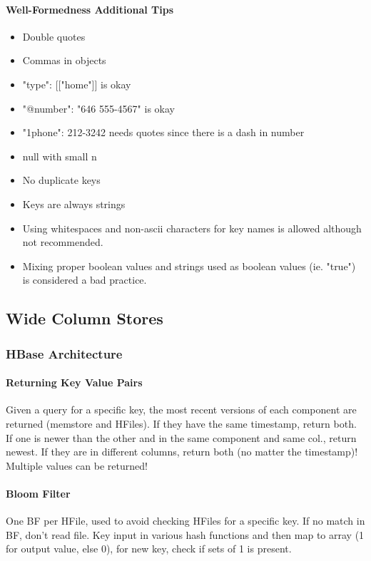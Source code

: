 \paragraph{Well-Formedness Additional Tips}
\begin{itemize}
    \item Double quotes
    \item Commas in objects
    \item "type": [["home"]] is okay
    \item "@number": "646 555-4567" is okay
    \item "1phone": 212-3242 needs quotes since there is a dash in number
    \item null with small n
    \item No duplicate keys
    \item Keys are always strings
    \item Using whitespaces and non-ascii characters for key names is allowed although not recommended.
    \item Mixing proper boolean values and strings used as boolean values (ie. "true") is considered a bad practice.
\end{itemize}




\subsection{Wide Column Stores}


\subsubsection{HBase Architecture}

\paragraph{Returning Key Value Pairs}
Given a query for a specific key, the most recent versions of each component are returned (memstore and HFiles). If they have the same timestamp, return both. If one is newer than the other and in the same component and same col., return newest. If they are in different columns, return both (no matter the timestamp)! Multiple values can be returned!

\paragraph{Bloom Filter}
One BF per HFile, used to avoid checking HFiles for a specific key. If no match in BF, don't read file. Key input in various hash functions and then map to array (1 for output value, else 0), for new key, check if sets of 1 is present.

